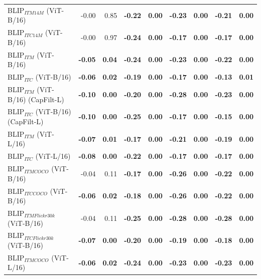 \begin{table}[ht]
\begin{adjustbox}{max width=\textwidth}
\begin{tabular}{l|rr|rrrrrr}
 BLIP$_{ITM 14M}$ (ViT-B/16)         & -0.00          & 0.85          & \textbf{-0.22} & \textbf{0.00} & \textbf{-0.23} & \textbf{0.00} & \textbf{-0.21} & \textbf{0.00} \\
 BLIP$_{ITC 14M}$ (ViT-B/16)         & -0.00          & 0.97          & \textbf{-0.24} & \textbf{0.00} & \textbf{-0.17} & \textbf{0.00} & \textbf{-0.17} & \textbf{0.00} \\
 BLIP$_{ITM}$ (ViT-B/16)             & \textbf{-0.05} & \textbf{0.04} & \textbf{-0.24} & \textbf{0.00} & \textbf{-0.23} & \textbf{0.00} & \textbf{-0.22} & \textbf{0.00} \\
 BLIP$_{ITC}$ (ViT-B/16)             & \textbf{-0.06} & \textbf{0.02} & \textbf{-0.19} & \textbf{0.00} & \textbf{-0.17} & \textbf{0.00} & \textbf{-0.13} & \textbf{0.01} \\
 BLIP$_{ITM}$ (ViT-B/16) (CapFilt-L) & \textbf{-0.10} & \textbf{0.00} & \textbf{-0.20} & \textbf{0.00} & \textbf{-0.28} & \textbf{0.00} & \textbf{-0.23} & \textbf{0.00} \\
 BLIP$_{ITC}$ (ViT-B/16) (CapFilt-L) & \textbf{-0.10} & \textbf{0.00} & \textbf{-0.25} & \textbf{0.00} & \textbf{-0.17} & \textbf{0.00} & \textbf{-0.15} & \textbf{0.00} \\
 BLIP$_{ITM}$ (ViT-L/16)             & \textbf{-0.07} & \textbf{0.01} & \textbf{-0.17} & \textbf{0.00} & \textbf{-0.21} & \textbf{0.00} & \textbf{-0.19} & \textbf{0.00} \\
 BLIP$_{ITC}$ (ViT-L/16)             & \textbf{-0.08} & \textbf{0.00} & \textbf{-0.22} & \textbf{0.00} & \textbf{-0.17} & \textbf{0.00} & \textbf{-0.17} & \textbf{0.00} \\
 BLIP$_{ITM COCO}$ (ViT-B/16)        & -0.04          & 0.11          & \textbf{-0.17} & \textbf{0.00} & \textbf{-0.26} & \textbf{0.00} & \textbf{-0.22} & \textbf{0.00} \\
 BLIP$_{ITC COCO}$ (ViT-B/16)        & \textbf{-0.06} & \textbf{0.02} & \textbf{-0.18} & \textbf{0.00} & \textbf{-0.26} & \textbf{0.00} & \textbf{-0.22} & \textbf{0.00} \\
 BLIP$_{ITM Flickr30k}$ (ViT-B/16)   & -0.04          & 0.11          & \textbf{-0.25} & \textbf{0.00} & \textbf{-0.28} & \textbf{0.00} & \textbf{-0.28} & \textbf{0.00} \\
 BLIP$_{ITC Flickr30k}$ (ViT-B/16)   & \textbf{-0.07} & \textbf{0.00} & \textbf{-0.20} & \textbf{0.00} & \textbf{-0.19} & \textbf{0.00} & \textbf{-0.18} & \textbf{0.00} \\
 BLIP$_{ITM COCO}$ (ViT-L/16)        & \textbf{-0.06} & \textbf{0.02} & \textbf{-0.24} & \textbf{0.00} & \textbf{-0.23} & \textbf{0.00} & \textbf{-0.23} & \textbf{0.00} \\

\end{tabular}
\end{adjustbox}
\end{table}
